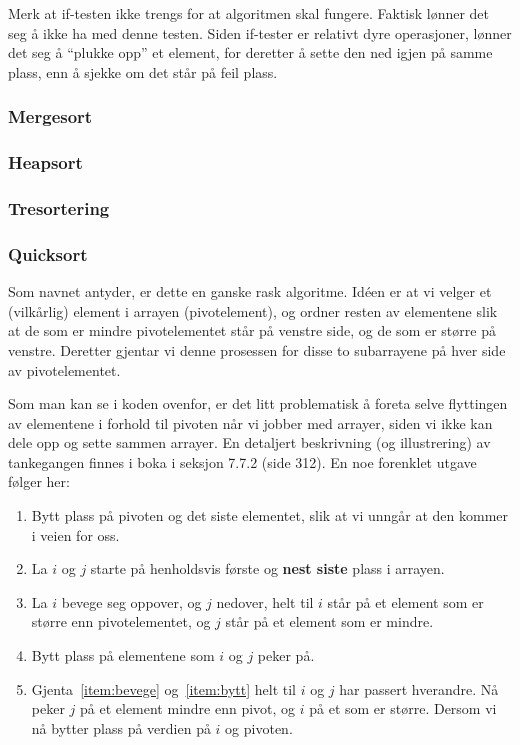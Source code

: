 Merk at if-testen ikke trengs for at algoritmen skal fungere.
Faktisk lønner det seg å ikke ha med denne testen.
Siden if-tester er relativt dyre operasjoner, lønner det seg å ``plukke opp'' et
element, for deretter å sette den ned igjen på samme plass, enn å sjekke om det
står på feil plass.


\subsubsection{\color{red}Mergesort}\label{mergesort}

\subsubsection{\color{red}Heapsort}\label{heapsort}

\subsubsection{\color{red}Tresortering}\label{treesort}

\subsubsection{\color{red}Quicksort}
\label{quick}
Som navnet antyder, er dette en ganske rask algoritme.
Idéen er at vi velger et (vilkårlig) element i arrayen (pivotelement), og ordner resten av
elementene slik at de som er mindre pivotelementet står på venstre side, og de
som er større på venstre. Deretter gjentar vi denne prosessen for disse to
subarrayene på hver side av pivotelementet.


Som man kan se i koden ovenfor, er det litt problematisk å foreta selve
flyttingen av elementene i forhold til pivoten når vi jobber med arrayer, siden
vi ikke kan dele opp og sette sammen arrayer. En detaljert beskrivning (og
illustrering) av tankegangen finnes i boka i seksjon 7.7.2 (side 312). 
En noe forenklet utgave følger her:
\begin{enumerate}
\item Bytt plass på pivoten og det siste elementet, slik at vi unngår at den
  kommer i veien for oss.
\item La $i$ og $j$ starte på henholdsvis første og \textbf{nest siste} plass i
  arrayen. 
\item\label{item:bevege} La $i$ bevege seg oppover, og $j$ nedover, helt til $i$ står på et
  element som er større enn pivotelementet, og $j$ står på et element som er
  mindre.
\item\label{item:bytt} Bytt plass på elementene som $i$ og $j$ peker på.
\item Gjenta~\ref{item:bevege} og~\ref{item:bytt} helt til $i$ og $j$ har
  passert hverandre. Nå peker $j$ på et element mindre enn pivot, og $i$ på et
  som er større. Dersom vi nå bytter plass på verdien på $i$ og pivoten.
\end{enumerate}

